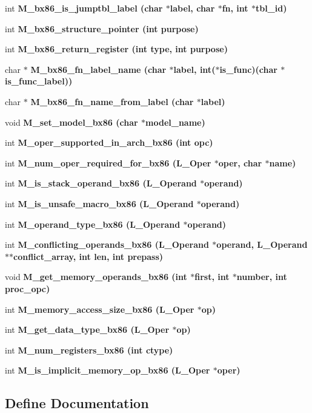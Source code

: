 \begin{CompactItemize}
\item 
int \bf{M\_\-bx86\_\-is\_\-jumptbl\_\-label} (char $\ast$label, char $\ast$fn, int $\ast$tbl\_\-id)
\item 
int \bf{M\_\-bx86\_\-structure\_\-pointer} (int purpose)
\item 
int \bf{M\_\-bx86\_\-return\_\-register} (int type, int purpose)
\item 
char $\ast$ \bf{M\_\-bx86\_\-fn\_\-label\_\-name} (char $\ast$label, int($\ast$is\_\-func)(char $\ast$is\_\-func\_\-label))
\item 
char $\ast$ \bf{M\_\-bx86\_\-fn\_\-name\_\-from\_\-label} (char $\ast$label)
\item 
void \bf{M\_\-set\_\-model\_\-bx86} (char $\ast$model\_\-name)
\item 
int \bf{M\_\-oper\_\-supported\_\-in\_\-arch\_\-bx86} (int opc)
\item 
int \bf{M\_\-num\_\-oper\_\-required\_\-for\_\-bx86} (L\_\-Oper $\ast$oper, char $\ast$\bf{name})
\item 
int \bf{M\_\-is\_\-stack\_\-operand\_\-bx86} (L\_\-Operand $\ast$operand)
\item 
int \bf{M\_\-is\_\-unsafe\_\-macro\_\-bx86} (L\_\-Operand $\ast$operand)
\item 
int \bf{M\_\-operand\_\-type\_\-bx86} (L\_\-Operand $\ast$operand)
\item 
int \bf{M\_\-conflicting\_\-operands\_\-bx86} (L\_\-Operand $\ast$operand, L\_\-Operand $\ast$$\ast$conflict\_\-array, int len, int prepass)
\item 
void \bf{M\_\-get\_\-memory\_\-operands\_\-bx86} (int $\ast$first, int $\ast$number, int proc\_\-opc)
\item 
int \bf{M\_\-memory\_\-access\_\-size\_\-bx86} (L\_\-Oper $\ast$op)
\item 
int \bf{M\_\-get\_\-data\_\-type\_\-bx86} (L\_\-Oper $\ast$op)
\item 
int \bf{M\_\-num\_\-registers\_\-bx86} (int ctype)
\item 
int \bf{M\_\-is\_\-implicit\_\-memory\_\-op\_\-bx86} (L\_\-Oper $\ast$oper)
\end{CompactItemize}


\subsection{Define Documentation}
